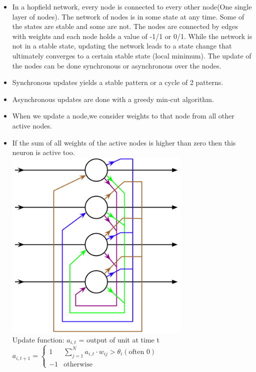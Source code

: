 \documentclass[english,11pt]{article}
\begin{document}
\begin{itemize}
\item In a hopfield network, every node is connected to every other node(One single layer of nodes). The network of nodes is in some state at any time. Some of the states are stable and some are not. The nodes are connected by edges with weights and each node holds a value of -1/1 or 0/1. While the network is not in a stable state, updating the network leads to a state change that ultimately converges to a certain stable state (local minimum). The update of the nodes can be done synchronous or asynchronous over the nodes.\\
\item Synchronous updates yields a stable pattern or a cycle of 2 patterns.
\item Asynchronous updates are done with a greedy min-cut algorithm.
\item When we update a node,we consider weights to that node from all other active nodes.
\item If the sum of all weights of the active nodes is higher than zero then this neuron is active too.\\
\includegraphics[width=0.7\textwidth]{hopfield-network.png}\\
Update function:
$a_{i,t}$ = output of unit at time t\\
$a_{i,t+1} =
\left\{
	\begin{array}{ll}
		1   & \sum_{j=1}^N a_{i,t}\cdot w_{ij} > \theta_i (\mbox{often 0}) \\
		-1 & \mbox{otherwise}
	\end{array}
\right.$
\end{itemize}
\end{document}
